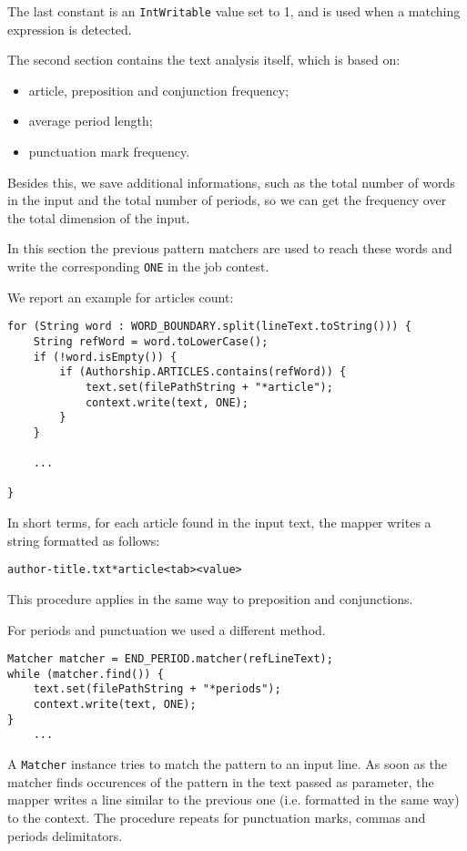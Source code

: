\documentclass[a4paper,11pt, twoside]{article}
\begin{document}
	The last constant is an \lstinline|IntWritable| value set to 1, and is used when a matching expression is detected.

	The second section contains the text analysis itself, which is based on: \begin{itemize}
		\item article, preposition and conjunction frequency;
		\item average period length;
		\item punctuation mark frequency.
	\end{itemize}
	Besides this, we save additional informations, such as the total number of words in the input and the total number of periods, so we can get the frequency over the total dimension of the input.

	In this section the previous pattern matchers are used to reach these words and write the corresponding \lstinline|ONE| in the job contest. 
	
	We report an example for articles count: \begin{lstlisting}[firstnumber=82, caption={Articles counting in Map method}, captionpos=b]
for (String word : WORD_BOUNDARY.split(lineText.toString())) {
	String refWord = word.toLowerCase();
	if (!word.isEmpty()) {
		if (Authorship.ARTICLES.contains(refWord)) {
			text.set(filePathString + "*article");
			context.write(text, ONE);
		}
	}

	...

}
	\end{lstlisting}
	
	In short terms, for each article found in the input text, the mapper writes a string formatted as follows:\begin{center}
		\texttt{author-title.txt*article\textless tab\textgreater \textless value\textgreater} 
	\end{center}

	This procedure applies in the same way to preposition and conjunctions.
	
	\bigskip
	\noindent
	For periods and punctuation we used a different method.
	\begin{lstlisting}[firstnumber=109, caption={Periods counting in Map method}, captionpos=b]
Matcher matcher = END_PERIOD.matcher(refLineText);
while (matcher.find()) {
	text.set(filePathString + "*periods");
	context.write(text, ONE);
}
	...
	\end{lstlisting}
	
	A \lstinline|Matcher| instance tries to match the pattern to an input line. As soon as the matcher finds occurences of the pattern in the text passed as parameter, the mapper writes a line similar to the previous one (i.e. formatted in the same way) to the context. The procedure repeats for punctuation marks, commas and periods delimitators.
	
\end{document}
